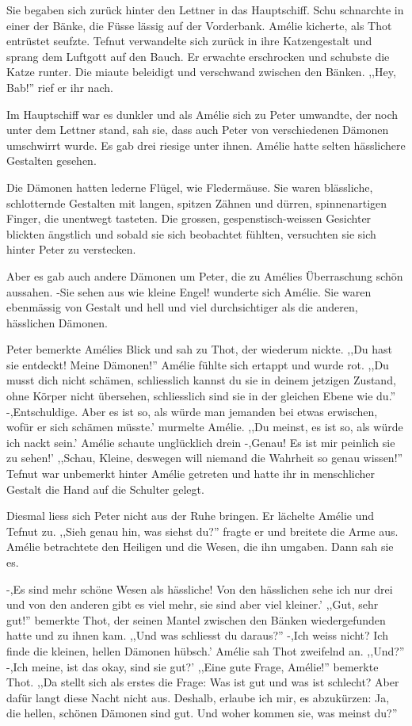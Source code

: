 \documentclass[11pt,titlepage,a5paper]{book}
\begin{document}
Sie begaben sich zurück hinter den Lettner in das Hauptschiff. Schu schnarchte in einer der Bänke, die Füsse lässig auf der Vorderbank. Amélie kicherte, als Thot entrüstet seufzte. Tefnut verwandelte sich zurück in ihre Katzengestalt und sprang dem Luftgott auf den Bauch. Er erwachte erschrocken und schubste die Katze runter. Die miaute beleidigt und verschwand zwischen den Bänken. ,,Hey, Bab!'' rief er ihr nach.

Im Hauptschiff war es dunkler und als Amélie sich zu Peter umwandte, der noch unter dem Lettner stand, sah sie, dass auch Peter von verschiedenen Dämonen umschwirrt wurde. Es gab drei riesige unter ihnen. Amélie hatte selten hässlichere Gestalten gesehen. 

Die Dämonen hatten lederne Flügel, wie Fledermäuse. Sie waren blässliche, schlotternde Gestalten mit langen, spitzen Zähnen und dürren, spinnenartigen Finger, die unentwegt tasteten. Die grossen, gespenstisch-weissen Gesichter blickten ängstlich und sobald sie sich beobachtet fühlten, versuchten sie sich hinter Peter zu verstecken.

Aber es gab auch andere Dämonen um Peter, die zu Amélies Überraschung schön aussahen. -Sie sehen aus wie kleine Engel! wunderte sich Amélie. Sie waren ebenmässig von Gestalt und hell und viel durchsichtiger als die anderen, hässlichen Dämonen. 

Peter bemerkte Amélies Blick und sah zu Thot, der wiederum nickte. ,,Du hast sie entdeckt! Meine Dämonen!'' Amélie fühlte sich ertappt und wurde rot. ,,Du musst dich nicht schämen, schliesslich kannst du sie in deinem jetzigen Zustand, ohne Körper nicht übersehen, schliesslich sind sie in der gleichen Ebene wie du.'' -,Entschuldige. Aber es ist so, als würde man jemanden bei etwas erwischen, wofür er sich schämen müsste.' murmelte Amélie. ,,Du meinst, es ist so, als würde ich nackt sein.' Amélie schaute unglücklich drein -,Genau! Es ist mir peinlich sie zu sehen!' ,,Schau, Kleine, deswegen will niemand die Wahrheit so genau wissen!'' Tefnut war unbemerkt hinter Amélie getreten und hatte ihr in menschlicher Gestalt die Hand auf die Schulter gelegt. 

Diesmal liess sich Peter nicht aus der Ruhe bringen. Er lächelte Amélie und Tefnut zu. ,,Sieh genau hin, was siehst du?'' fragte er und breitete die Arme aus. Amélie betrachtete den Heiligen und die Wesen, die ihn umgaben. Dann sah sie es.

-,Es sind mehr schöne Wesen als hässliche! Von den hässlichen sehe ich nur drei und von den anderen gibt es viel mehr, sie sind aber viel kleiner.' ,,Gut, sehr gut!'' bemerkte Thot, der seinen Mantel zwischen den Bänken wiedergefunden hatte und zu ihnen kam. ,,Und was schliesst du daraus?'' -,Ich weiss nicht? Ich finde die kleinen, hellen Dämonen hübsch.' Amélie sah Thot zweifelnd an. ,,Und?'' -,Ich meine, ist das okay, sind sie gut?' ,,Eine gute Frage, Amélie!'' bemerkte Thot. ,,Da stellt sich als erstes die Frage: Was ist gut und was ist schlecht? Aber dafür langt diese Nacht nicht aus. Deshalb, erlaube ich mir, es abzukürzen: Ja, die hellen, schönen Dämonen sind gut. Und woher kommen sie, was meinst du?'' 
\end{document}
